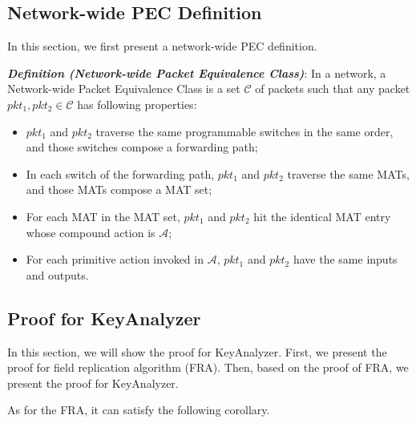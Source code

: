 \documentclass[sigconf, 10pt]{acmart}
\theoremstyle{plain}
\begin{document}




\subsection{Network-wide PEC Definition}

In this section, we first present a network-wide PEC definition. 

\noindent\textsl{\textbf{Definition (Network-wide Packet Equivalence Class)}}: In a network, 
a Network-wide Packet Equivalence Class is a set $\mathcal{C}$ of packets such that any packet $pkt_1, pkt_2 \in \mathcal{C}$ has following properties:

\begin{itemize}
    
    \item $pkt_1$ and $pkt_2$ traverse the same programmable switches in the same order, and those switches compose a forwarding path;
    \item In each switch of the forwarding path, $pkt_1$ and $pkt_2$ traverse the same MATs, and those MATs compose a MAT set;
    \item For each MAT in the MAT set, $pkt_1$ and $pkt_2$ hit the identical MAT entry whose compound action is $\mathcal{A}$;
    \item For each primitive action invoked in $\mathcal{A}$, $pkt_1$ and $pkt_2$ have the same inputs and outputs.

\end{itemize}


\subsection{Proof for KeyAnalyzer}

In this section, we will show the proof for KeyAnalyzer. First, we present the proof for field replication algorithm (FRA). Then, based on the proof of FRA, we present the proof for KeyAnalyzer.

As for the FRA, it can satisfy the following corollary.
\end{document}
